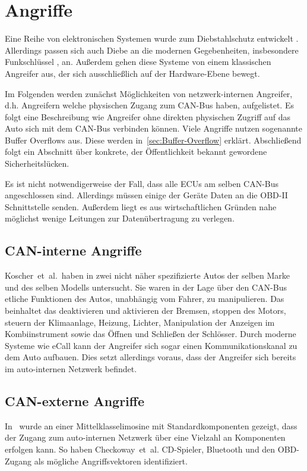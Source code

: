 \chapter{Angriffe}\label{ch:attack}

Eine Reihe von elektronischen Systemen wurde zum Diebstahlschutz entwickelt
\cite{Song2008,Turner1999,Hwang1997}. Allerdings passen sich auch Diebe an die
modernen Gegebenheiten, insbesondere Funkschlüssel \cite{Lee2014}, an. Außerdem
gehen diese Systeme von einem klassischen Angreifer aus, der sich
ausschließlich auf der Hardware-Ebene bewegt.

Im Folgenden werden zunächst Möglichkeiten von netzwerk-internen Angreifer,
d.h. Angreifern welche physischen Zugang zum CAN-Bus haben, aufgelistet. Es
folgt eine Beschreibung wie Angreifer ohne direkten physischen Zugriff auf das
Auto sich mit dem CAN-Bus verbinden können. Viele Angriffe nutzen sogenannte
Buffer Overflows aus. Diese werden in~\cref{sec:Buffer-Overflow} erklärt.
Abschließend folgt ein Abschnitt über konkrete, der Öffentlichkeit bekannt
gewordene Sicherheitslücken.

Es ist nicht notwendigerweise der Fall, dass alle ECUs am selben CAN-Bus
angeschlossen sind. Allerdings müssen einige der Geräte Daten an die OBD-II
Schnittstelle senden. Außerdem liegt es aus wirtschaftlichen Gründen nahe
möglichst wenige Leitungen zur Datenübertragung zu verlegen.


\section{CAN-interne Angriffe}
Koscher~et~al.~haben in \cite{Koscher2010} zwei nicht näher spezifizierte Autos
der selben Marke und des selben Modells untersucht. Sie waren in der Lage über
den CAN-Bus etliche Funktionen des Autos, unabhängig vom Fahrer, zu
manipulieren. Das beinhaltet das deaktivieren und aktivieren der Bremsen,
stoppen des Motors, steuern der Klimaanlage, Heizung, Lichter, Manipulation der
Anzeigen im Kombiinstrument sowie das Öffnen und Schließen der Schlösser. Durch
moderne Systeme wie eCall kann der Angreifer sich sogar einen
Kommunikationskanal zu dem Auto aufbauen. Dies setzt allerdings voraus, dass
der Angreifer sich bereits im auto-internen Netzwerk befindet.

\section{CAN-externe Angriffe}
In~\cite{Checkoway2011} wurde an einer Mittelklasselimosine mit
Standardkomponenten gezeigt, dass der Zugang zum auto-internen Netzwerk über
eine Vielzahl an Komponenten erfolgen kann. So haben Checkoway~et~al.
CD-Spieler, Bluetooth und den OBD-Zugang als mögliche Angriffsvektoren
identifiziert.

